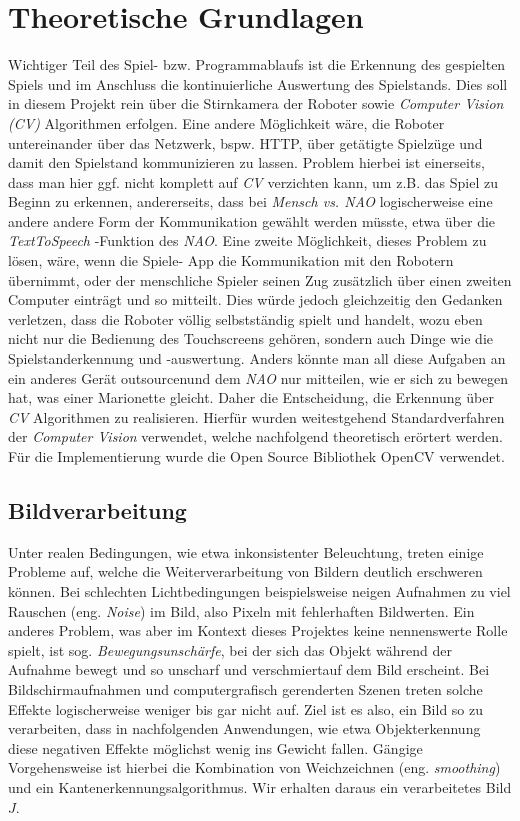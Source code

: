 \section{Theoretische Grundlagen}
Wichtiger Teil des Spiel- bzw. Programmablaufs ist die Erkennung des gespielten Spiels und im Anschluss die kontinuierliche Auswertung
des Spielstands. Dies soll in diesem Projekt rein \"uber die Stirnkamera der Roboter sowie \textit{Computer Vision (CV)} Algorithmen erfolgen.
Eine andere M\"oglichkeit w\"are, die Roboter untereinander über das Netzwerk, bspw. HTTP, über getätigte Spielzüge und damit den Spielstand
kommunizieren zu lassen. Problem hierbei ist einerseits, dass man hier ggf. nicht komplett auf \textit{CV} verzichten kann, um z.B. das Spiel
zu Beginn zu erkennen, andererseits, dass bei \textit{Mensch vs. NAO} logischerweise eine andere andere Form der Kommunikation gewählt werden
müsste, etwa über die \textit{TextToSpeech} -Funktion des \textit{NAO}. Eine zweite Möglichkeit, dieses Problem zu lösen, wäre, wenn die Spiele-
App die Kommunikation mit den Robotern übernimmt, oder der menschliche Spieler seinen Zug zusätzlich über einen zweiten Computer einträgt und so
mitteilt. Dies würde jedoch gleichzeitig den Gedanken verletzen, dass die Roboter völlig selbstständig spielt und handelt, wozu eben nicht nur die
Bedienung des Touchscreens gehören, sondern auch Dinge wie die Spielstanderkennung und -auswertung. Anders könnte man all diese Aufgaben an ein anderes
Gerät \dq outsourcen\dq und dem \textit{NAO} nur mitteilen, wie er sich zu bewegen hat, was einer Marionette gleicht. Daher die Entscheidung,
die Erkennung über \textit{CV} Algorithmen zu realisieren. Hierfür wurden weitestgehend Standardverfahren der \textit{Computer Vision} verwendet, welche
nachfolgend theoretisch erörtert werden. Für die Implementierung wurde die Open Source Bibliothek OpenCV verwendet\cite{opencv_library}.

\subsection{Bildverarbeitung}
Unter realen Bedingungen, wie etwa inkonsistenter Beleuchtung, treten einige Probleme auf, welche die Weiterverarbeitung von Bildern deutlich erschweren 
können. Bei schlechten Lichtbedingungen beispielsweise neigen Aufnahmen zu viel Rauschen (eng. \textit{Noise}) im Bild, also Pixeln mit fehlerhaften Bildwerten\cite{CAVE_0394}.
Ein anderes Problem, was aber im Kontext dieses Projektes keine nennenswerte Rolle spielt, ist sog. \textit{Bewegungsunschärfe}, bei der sich das Objekt während 
der Aufnahme bewegt und so unscharf und \dq verschmiert\dq auf dem Bild erscheint\cite[S.\. 43]{Klette14}. Bei Bildschirmaufnahmen und computergrafisch gerenderten Szenen treten solche
Effekte logischerweise weniger bis gar nicht auf. Ziel ist es also, ein Bild so zu verarbeiten, dass in nachfolgenden Anwendungen, wie etwa Objekterkennung
diese negativen Effekte möglichst wenig ins Gewicht fallen. Gängige Vorgehensweise ist hierbei die Kombination von Weichzeichnen (eng. \textit{smoothing}) und
ein Kantenerkennungsalgorithmus. Wir erhalten daraus ein verarbeitetes Bild $J$.

